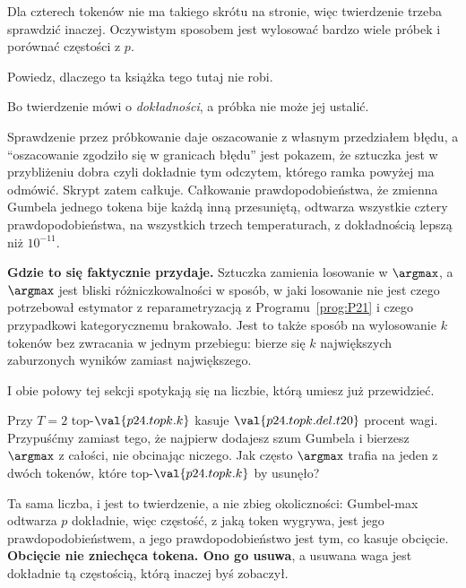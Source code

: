 \begin{fr}
Dla czterech tokenów nie ma takiego skrótu na stronie, więc twierdzenie trzeba
sprawdzić inaczej. Oczywistym sposobem jest wylosować bardzo wiele próbek i
porównać częstości z $p$.

Powiedz, dlaczego ta książka tego tutaj nie robi.
\dotline
\nextframe
\end{fr}

\begin{fr}
\begin{ansblock}
Bo twierdzenie mówi o \emph{dokładności}, a próbka nie może jej ustalić.
\end{ansblock}

Sprawdzenie przez próbkowanie daje oszacowanie z własnym przedziałem błędu, a
\enquote{oszacowanie zgodziło się w granicach błędu} jest pokazem, że sztuczka
jest w przybliżeniu dobra \dash{} czyli dokładnie tym odczytem, którego ramka
powyżej ma odmówić. Skrypt zatem całkuje. Całkowanie prawdopodobieństwa, że
zmienna Gumbela jednego tokena bije każdą inną przesuniętą, odtwarza wszystkie
cztery prawdopodobieństwa, na wszystkich trzech temperaturach, z dokładnością
lepszą niż $10^{-11}$.

\begin{aibox}
\textbf{Gdzie to się faktycznie przydaje.} Sztuczka zamienia losowanie w
$\argmax$, a $\argmax$ jest bliski różniczkowalności w sposób, w jaki losowanie
nie jest \dash{} czego potrzebował estymator z reparametryzacją z
Programu~\ref{prog:P21} i czego przypadkowi kategorycznemu brakowało. Jest to
także sposób na wylosowanie $k$ tokenów bez zwracania w jednym przebiegu:
bierze się $k$ największych zaburzonych wyników zamiast największego.
\end{aibox}
\end{fr}

\begin{fr}
I obie połowy tej sekcji spotykają się na liczbie, którą umiesz już
przewidzieć.

Przy $T = 2$ top-$\val{p24.topk.k}$ kasuje $\val{p24.topk.del.t20}$ procent
wagi. Przypuśćmy zamiast tego, że najpierw dodajesz szum Gumbela i bierzesz
$\argmax$ z całości, nie obcinając niczego. Jak często $\argmax$ trafia na
jeden z dwóch tokenów, które top-$\val{p24.topk.k}$ by usunęło?
\dotline
\nextframe
\end{fr}

\begin{fr}

Ta sama liczba, i jest to twierdzenie, a nie zbieg okoliczności: Gumbel-max
odtwarza $p$ dokładnie, więc częstość, z jaką token wygrywa, jest jego
prawdopodobieństwem, a jego prawdopodobieństwo jest tym, co kasuje obcięcie.
\textbf{Obcięcie nie zniechęca tokena. Ono go usuwa}, a usuwana waga jest
dokładnie tą częstością, którą inaczej byś zobaczył.
\end{fr}

